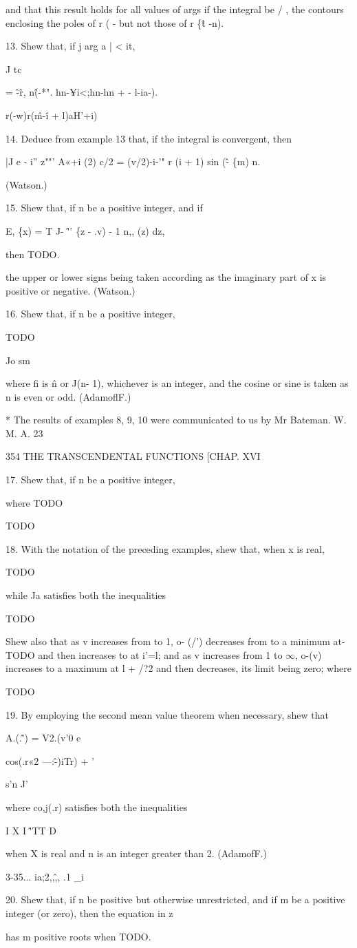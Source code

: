 and that this result holds for all values of args if the integral be /
, the contours enclosing the poles of r ( - but not those of r \{\^t
-n).

13. Shew that, if j arg a | < it,

J tc

= \^-\^ r, n\^(-*". hn-¥i<;hn-hn + - l-ia-).

r(-w)r(\^m-\^i + l)aH'+i)

14. Deduce from example 13 that, if the integral is convergent, then

|J e - i'' z""' A«+i (2) c/2 = (v/2)-i-'" r (i + 1) sin (\^ - \{m) n.

(Watson.)

15. Shew that, if n be a positive integer, and if

E, \{x) = T J- \^'' \{z - .v) - 1 n,, (z) dz,

then TODO.

the upper or lower signs being taken according as the imaginary part
of x is positive or negative. (Watson.)

16. Shew that, if n be a positive integer,

TODO

Jo sm

where fi is \^n or J(n- 1), whichever is an integer, and the cosine or
sine is taken as n is even or odd. (AdamoflF.)

* The results of examples 8, 9, 10 were communicated to us by Mr
Bateman. W. M. A. 23

354 THE TRANSCENDENTAL FUNCTIONS [CHAP. XVI

17. Shew that, if n be a positive integer,

where TODO

TODO 

18. With the notation of the preceding examples, shew that, when x is
real,

TODO

while Ja satisfies both the inequalities

TODO

Shew also that as v increases from to 1, o- (/') decreases from to a
minimum at- TODO and then increases to at i'=l; and as v increases
from 1 to $\infty$, o-(v) increases to a maximum at l + /?2 and then
decreases, its limit being zero; where

TODO 

19. By employing the second mean value theorem when necessary, shew
that

A.(.\^') = V2.(v'0 e

cos(.r«2 —:\^-)iTr) + '

s'n J'

where co,j(.r) satisfies both the inequalities

I X I \^'TT D

when X is real and n is an integer greater than 2. (AdamofF.)

3-35... ia;2,,\^,, .1 \_i

20. Shew that, if n be positive but otherwise unrestricted, and if m
be a positive integer (or zero), then the equation in z

has m positive roots when TODO. 